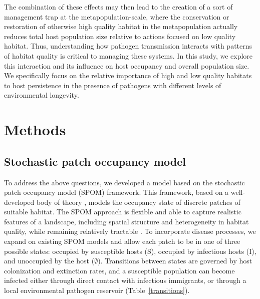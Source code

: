 \documentclass{article}
\begin{document}
The combination of these effects may then lead to the creation of a sort of management trap at the metapopulation-scale, where the conservation or restoration of otherwise high quality habitat in the metapopulation actually reduces total host population size relative to actions focused on low quality habitat.
Thus, understanding how pathogen transmission interacts with patterns of habitat quality is critical to managing these systems.  In this study, we explore this interaction and its influence on host occupancy and overall population size.  We specifically focus on the relative importance of high and low quality habitats to host persistence in the presence of pathogens with different levels of environmental longevity. 

\section{Methods}
\label{methods}

\subsection{Stochastic patch occupancy model}

To address the above questions, we developed a model based on the stochastic patch occupancy model (SPOM) framework.
This framework, based on a well-developed body of theory \cite{Hanski2003, Ovaskainen2004}, models the occupancy state of discrete patches of suitable habitat.
The SPOM approach is flexible and able to capture realistic features of a landscape, including spatial structure and heterogeneity in habitat quality, while remaining relatively tractable \cite{Ovaskainen2004}.
To incorporate disease processes, we expand on existing SPOM models \cite{Hanski2003, Ovaskainen2004} and allow each patch to be in one of three possible states: occupied by susceptible hosts (S), occupied by infectious hosts (I), and unoccupied by the host ($\emptyset$).  
Transitions between states are governed by host colonization and extinction rates, and a susceptible population can become infected either through direct contact with infectious immigrants, or through a local environmental pathogen reservoir (Table~\ref{transitions}).
\end{document}
